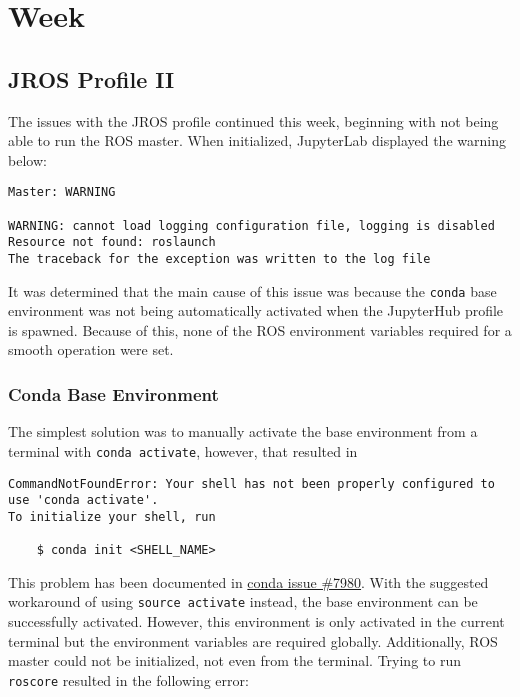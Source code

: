 \chapter{Week}

\section{JROS Profile II}

    The issues with the JROS profile continued this week, beginning with not being able to run the ROS master. When initialized, JupyterLab displayed the warning below: 


    \begin{lstlisting}[language=warning]
Master: WARNING

WARNING: cannot load logging configuration file, logging is disabled
Resource not found: roslaunch
The traceback for the exception was written to the log file     
    \end{lstlisting}

    \noindent It was determined that the main cause of this issue was because the \texttt{conda} base environment was not being automatically activated when the JupyterHub profile is spawned. Because of this, none of the ROS environment variables required for a smooth operation were set.

    \subsection{Conda Base Environment}

    The simplest solution was to manually activate the base environment from a terminal with \texttt{conda activate}, however, that resulted in

    \begin{lstlisting}[language=error]
CommandNotFoundError: Your shell has not been properly configured to use 'conda activate'.
To initialize your shell, run

    $ conda init <SHELL_NAME>
    \end{lstlisting}




    \noindent This problem has been documented in \href{https://github.com/conda/conda/issues/7980}{conda issue \#7980}. With the suggested workaround of using \texttt{source activate} instead, the base environment can be successfully activated. However, this environment is only activated in the current terminal but the environment variables are required globally. Additionally, ROS master could not be initialized, not even from the terminal. Trying to run \texttt{roscore} resulted in the following error:

